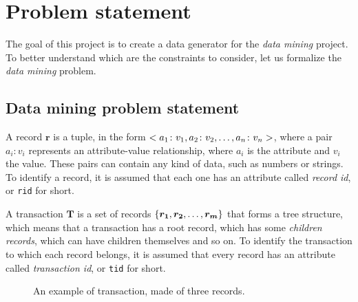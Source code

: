 \documentclass{acm_proc_article-sp-sigmod09}
\begin{document}
\section{Problem statement}
The goal of this project is to create a data generator for the \emph{data mining} project. To better understand which are the constraints to consider, let us formalize the \emph{data mining} problem.

\subsection{Data mining problem statement}
A record $\boldsymbol{r}$ is a tuple, in the form $<a_1 \colon v_1, a_2 \colon v_2, \text{\dots}, a_n \colon v_n>$, where a pair $a_i \colon v_i$ represents an attribute-value relationship, where $a_i$ is the attribute and $v_i$ the value. These pairs can contain any kind of data, such as numbers or strings. To identify a record, it is assumed that each one has an attribute called \emph{record id}, or \texttt{rid} for short.

A transaction $\boldsymbol{T}$ is a set of records $\{\boldsymbol{r_1}, \boldsymbol{r_2}, \text{\dots}, \boldsymbol{r_m}\}$ that forms a tree structure, which means that a transaction has a root record, which has some \emph{children records}, which can have children themselves and so on. To identify the transaction to which each record belongs, it is assumed that every record has an attribute called \emph{transaction id}, or \texttt{tid} for short.

\begin{figure}
\centering
{}
\caption{An example of transaction, made of three records.}
\label{fig:transaction}
\end{figure}
\end{document}
